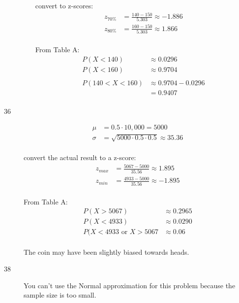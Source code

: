 \documentclass[letterpaper]{exam}
\begin{document}
\begin{description}
\begin{enumerate}[(a)]
            convert to z-scores:
            \begin{align*}
              z_{70\%} &= \frac{140 - 150}{5.303} \approx -1.886 \\
              z_{80\%} &= \frac{160 - 150}{5.303} \approx 1.866 \\
            \end{align*}

            From Table A:
            \begin{align*}
              P(X < 140) & \approx 0.0296 \\
              P(X < 160) & \approx 0.9704 \\
              \\
              P(140 < X < 160) & \approx 0.9704 - 0.0296 \\
                               & = 0.9407 \\
            \end{align*}
        
        \end{enumerate}

      \item[36]
        \begin{align*}
          \mu    & = 0.5 \cdot 10,000 = 5000 \\
          \sigma & = \sqrt{5000 \cdot 0.5 \cdot 0.5} \approx 35.36 \\
        \end{align*}

        convert the actual result to a z-score:
        \begin{align*}
          z_{max} &= \frac{5067 - 5000}{35.56} \approx 1.895 \\
          z_{min} &= \frac{4933 - 5000}{35.56} \approx -1.895 \\
        \end{align*}

        From Table A:
        \begin{align*}
          P(X > 5067) & \approx 0.2965 \\
          P(X < 4933) & \approx 0.0290 \\
          P(X < 4933 \text{ or } X > 5067 &\approx \boxed{ 0.06 } \\
        \end{align*}

        The coin may have been slightly biased towards heads.

      \item[38]
        You can't use the Normal approximation for this problem because the
        sample size is too small.


\end{description}
\end{document}
